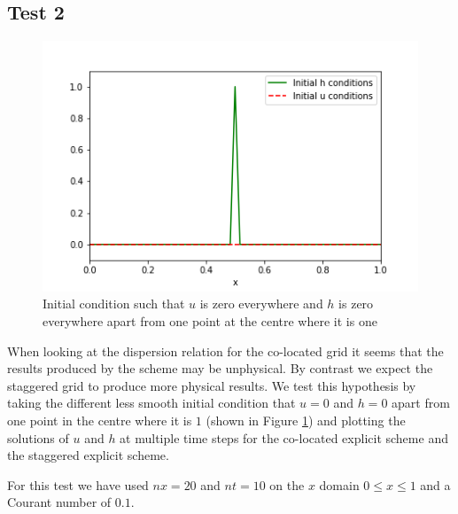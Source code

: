 \documentclass[a4paper,12pt, notitlepage]{article}
\begin{document}
\subsection{Test 2}
\begin{figure}[H]
\begin{center}
\begin{minipage}{.5\textwidth}
	\centering
	\captionsetup{width=2\textwidth}
	\captionsetup{justification=centering}
	\includegraphics[width=\textwidth]{initial_condition_spike.png}
	\caption{\label{initialconditionspike}Initial condition such that $u$ is zero everywhere and $h$ is zero everywhere apart from one point at the centre where it is one} 
\end{minipage}
\end{center}
\end{figure}

When looking at the dispersion relation for the co-located grid it seems that the results produced by the scheme may be unphysical. By contrast we expect the staggered grid to produce more physical results. We test this hypothesis by taking the different less smooth initial condition that $u =0$ and $h = 0$ apart from one point in the centre where it is $1$ (shown in Figure \ref{initialconditionspike}) and plotting the solutions of $u$ and $h$ at multiple time steps for the co-located explicit scheme and the staggered explicit scheme.

For this test we have used $nx = 20$ and $nt = 10$ on the $x$ domain $0 \leq x \leq 1$ and a Courant number of $0.1$.
\end{document}
